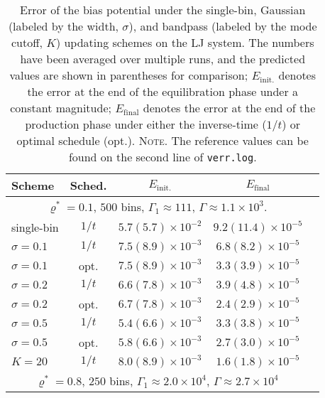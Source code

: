 \documentclass[preprint, superscriptaddress, floatfix]{revtex4-1}
\newcommand{\note}[1]{{\color{DarkGreen}\footnotesize \textsc{Note.} #1}}
\newcommand{\Err}{E}
\begin{document}
\begin{table}[h]\footnotesize
  \caption{\label{tab:lj_error}
    Error of the bias potential under
    the single-bin,
    Gaussian (labeled by the width, $\sigma$),
    and bandpass (labeled by the mode cutoff, $K$)
    updating schemes
    on the LJ system.
    The numbers have been averaged over multiple runs,
    and the predicted values are shown in parentheses for comparison;
    $\Err_\mathrm{init.}$
    denotes the error
    at the end of the equilibration phase under a constant magnitude;
    $\Err_\mathrm{final}$
    denotes the error at the end of the production phase under
    either the inverse-time ($1/t$) or optimal schedule (opt.).
    \note{The reference values can be found
    on the second line of \texttt{verr.log}.}%
  }
  \setlength{\tabcolsep}{2pt}
  \renewcommand\arraystretch{1.4}
  \begin{tabular} { l c c c c }
    \hline
    Scheme & Sched. &
    $\Err_\mathrm{init.}$ &
    $\Err_\mathrm{final}$
    \\
    \hline
    \multicolumn{4}{c}{
      $\varrho^* = 0.1$,
      $500$ bins,
      $\Gamma_1 \approx 111$,
      $\Gamma \approx 1.1\times10^3$.
    } \\
    \hline
    single-bin & $1/t$
    & $5.7(5.7)\times10^{-2}$
    & $9.2(11.4)\times10^{-5}$
    \\
    $\sigma=0.1$ & $1/t$
    & $7.5(8.9)\times10^{-3}$
    & $6.8(8.2)\times10^{-5}$
    \\
    $\sigma=0.1$ & opt.
    & $7.5(8.9)\times10^{-3}$
    & $3.3(3.9)\times10^{-5}$
    \\
    $\sigma=0.2$ & $1/t$
    & $6.6(7.8)\times10^{-3}$
    & $3.9(4.8)\times10^{-5}$
    \\
    $\sigma=0.2$ & opt.
    & $6.7(7.8)\times10^{-3}$
    & $2.4(2.9)\times10^{-5}$
    \\
    $\sigma=0.5$ & $1/t$
    & $5.4(6.6)\times10^{-3}$
    & $3.3(3.8)\times10^{-5}$
    \\
    $\sigma=0.5$ & opt.
    & $5.8(6.6)\times10^{-3}$
    & $2.7(3.0)\times10^{-5}$
    \\
    $K=20$ & $1/t$
    & $8.0(8.9)\times10^{-3}$
    & $1.6(1.8)\times10^{-5}$
    \\
    \hline
    \multicolumn{4}{c}{
      $\varrho^* = 0.8$,
      $250$ bins,
      $\Gamma_1 \approx 2.0\times10^4$,
      $\Gamma \approx 2.7\times10^4$
    } \\

\end{tabular}
\end{table}
\end{document}
